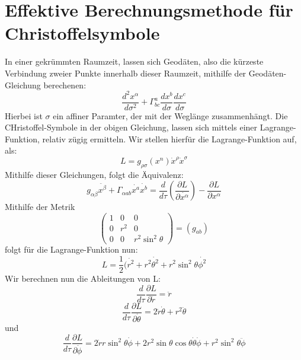 \documentclass[a4paper]{article}
\begin{document}
\section{Effektive Berechnungsmethode für Christoffelsymbole}
In einer gekrümmten Raumzeit, lassen sich Geodäten, also die kürzeste Verbindung zweier Punkte innerhalb dieser Raumzeit, mithilfe der Geodäten-Gleichung berechenen:
\begin{equation}
    \frac{d^2x^\alpha}{d\sigma^2}+\Gamma^{a}_{bc}\frac{dx^b}{d\sigma}\frac{dx^c}{d\sigma}
\end{equation}
Hierbei ist $\sigma$ ein affiner Paramter, der mit der Weglänge zusammenhängt. Die CHristoffel-Symbole in der obigen Gleichung, lassen sich mittels einer Lagrange-Funktion, relativ zügig ermitteln. Wir stellen hierfür die Lagrange-Funktion auf, als:
\begin{equation}
    L=g_{\rho\sigma}(x^n)\dot{x}^\rho\dot{x}^\sigma
\end{equation}
Mithilfe dieser Gleichungen, folgt die Äquivalenz:
\begin{equation}
    g_{\alpha\beta}\ddot{x^\beta}+\Gamma_{\alpha ab}\dot{x^a}\dot{x^b}=\frac{d}{d\tau}(\frac{\partial L}{\partial\dot{x^\alpha}})-\frac{\partial L}{\partial x^\alpha}
\end{equation}
 Mithilfe der Metrik
 \begin{equation}
     \begin{pmatrix}
         1 & 0 & 0 \\
         0 & r^2 & 0 \\
         0 & 0 & r^2\sin^2{\theta}
     \end{pmatrix}
     =(g_{ab})
 \end{equation}
folgt für die Lagrange-Funktion nun:
\begin{equation}
    L=\frac{1}{2}(\dot{r^2}+r^2\dot{\theta^2}+r^2\sin^2{\theta}\dot{\phi^2}
\end{equation}
Wir berechnen nun die Ableitungen von L:
\begin{equation}
    \frac{d}{d\tau}\frac{\partial L}{\partial\dot{r}}=\ddot{r}
\end{equation}
\begin{equation}
    \frac{d}{d\tau}\frac{\partial L}{\partial\dot{\theta}}=2\dot{r}\dot{\theta}+r^2\ddot{\theta}
\end{equation}
und
\begin{equation}
    \frac{d}{d\tau}\frac{\partial L}{\partial\dot{\phi}}=2\dot{r}r\sin^2{\theta}\dot{\phi}+2r^2\sin{\theta}\cos{\theta}\dot{\theta}\dot{\phi}+r^2\sin^2{\theta}\ddot{\phi}
\end{equation}
\end{document}
